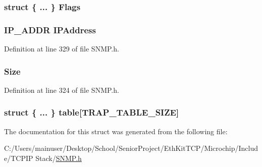 \subsubsection[{Flags}]{\setlength{\rightskip}{0pt plus 5cm}struct \{ ... \}   Flags}\label{struct_t_r_a_p___i_n_f_o_a52d4473af1591b9de69859139d8c564b}
\hypertarget{struct_t_r_a_p___i_n_f_o_a752c0ed2457a0c6b85437dd48b5c1a59}{}
\subsubsection[{I\+P\+Address}]{\setlength{\rightskip}{0pt plus 5cm}I\+P\+\_\+\+A\+D\+D\+R I\+P\+Address}\label{struct_t_r_a_p___i_n_f_o_a752c0ed2457a0c6b85437dd48b5c1a59}


Definition at line 329 of file S\+N\+M\+P.\+h.

\hypertarget{struct_t_r_a_p___i_n_f_o_a72a731e6518bee75f8bd1534ad397971}{}
\subsubsection[{Size}]{ Size}\label{struct_t_r_a_p___i_n_f_o_a72a731e6518bee75f8bd1534ad397971}


Definition at line 324 of file S\+N\+M\+P.\+h.

\hypertarget{struct_t_r_a_p___i_n_f_o_a2e79ee73ee811062ae562aac2ea74c3b}{}
\subsubsection[{table}]{\setlength{\rightskip}{0pt plus 5cm}struct \{ ... \}   table\mbox{[}{\bf T\+R\+A\+P\+\_\+\+T\+A\+B\+L\+E\+\_\+\+S\+I\+Z\+E}\mbox{]}}\label{struct_t_r_a_p___i_n_f_o_a2e79ee73ee811062ae562aac2ea74c3b}


The documentation for this struct was generated from the following file\+:\begin{DoxyCompactItemize}
\item 
C\+:/\+Users/mainuser/\+Desktop/\+School/\+Senior\+Project/\+Eth\+Kit\+T\+C\+P/\+Microchip/\+Include/\+T\+C\+P\+I\+P Stack/\hyperlink{_s_n_m_p_8h}{S\+N\+M\+P.\+h}\end{DoxyCompactItemize}
